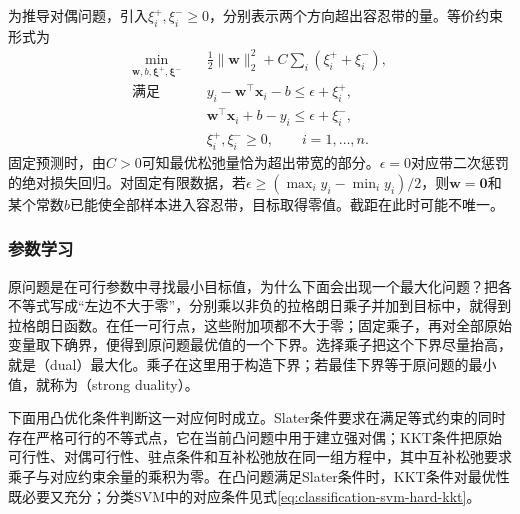 为推导对偶问题，引入$\xi_i^+,\xi_i^-\geq0$，分别表示两个方向超出容忍带的量。等价约束形式为
\begin{equation}
  \begin{aligned}
    \min_{\bm{w},b,\bm{\xi}^+,\bm{\xi}^-}\quad&
       \tfrac12\lVert\bm{w}\rVert_2^2+C\sum_i(\xi_i^++\xi_i^-),\\
    \text{满足}\quad&
       y_i-\bm{w}^{\top}\bm{x}_i-b\leq\epsilon+\xi_i^+,\\
      &\bm{w}^{\top}\bm{x}_i+b-y_i\leq\epsilon+\xi_i^-,\\
      &\xi_i^+,\xi_i^-\geq0,\qquad i=1,\ldots,n.
  \end{aligned}
  \label{eq:regression-svr-primal}
\end{equation}
固定预测时，由$C>0$可知最优松弛量恰为超出带宽的部分。$\epsilon=0$对应带二次惩罚的绝对损失回归。对固定有限数据，若$\epsilon\geq(\max_i y_i-\min_i y_i)/2$，则$\bm{w}=\bm{0}$和某个常数$b$已能使全部样本进入容忍带，目标取得零值。截距在此时可能不唯一。

\subsubsection{参数学习}

原问题是在可行参数中寻找最小目标值，为什么下面会出现一个最大化问题？把各不等式写成“左边不大于零”，分别乘以非负的拉格朗日乘子并加到目标中，就得到拉格朗日函数。在任一可行点，这些附加项都不大于零；固定乘子，再对全部原始变量取下确界，便得到原问题最优值的一个下界。选择乘子把这个下界尽量抬高，就是（dual）最大化。乘子在这里用于构造下界；若最佳下界等于原问题的最小值，就称为（strong duality）。

下面用凸优化条件判断这一对应何时成立。Slater条件要求在满足等式约束的同时存在严格可行的不等式点，它在当前凸问题中用于建立强对偶；KKT条件把原始可行性、对偶可行性、驻点条件和互补松弛放在同一组方程中，其中互补松弛要求乘子与对应约束余量的乘积为零。在凸问题满足Slater条件时，KKT条件对最优性既必要又充分；分类SVM中的对应条件见式\eqref{eq:classification-svm-hard-kkt}。

